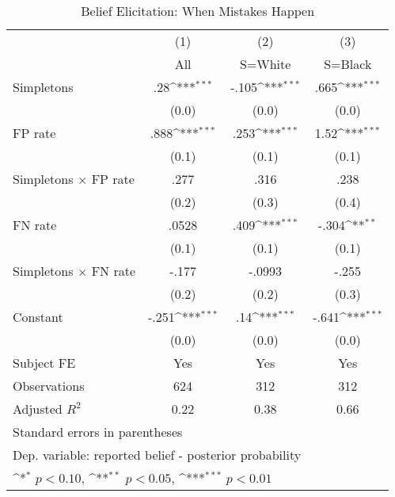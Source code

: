 \begin{table}[htbp]\centering
\def\sym#1{\ifmmode^{#1}\else\(^{#1}\)\fi}
\caption{Belief Elicitation: When Mistakes Happen}
\begin{tabular}{l*{3}{c}}
\hline\hline
                &\multicolumn{1}{c}{(1)}&\multicolumn{1}{c}{(2)}&\multicolumn{1}{c}{(3)}\\
                &\multicolumn{1}{c}{All}&\multicolumn{1}{c}{S=White}&\multicolumn{1}{c}{S=Black}\\
\hline
Simpletons      &      .28\sym{***}&    -.105\sym{***}&     .665\sym{***}\\
                &    (0.0)         &    (0.0)         &    (0.0)         \\
FP rate         &     .888\sym{***}&     .253\sym{***}&     1.52\sym{***}\\
                &    (0.1)         &    (0.1)         &    (0.1)         \\
Simpletons $\times$ FP rate&     .277         &     .316         &     .238         \\
                &    (0.2)         &    (0.3)         &    (0.4)         \\
FN rate         &    .0528         &     .409\sym{***}&    -.304\sym{**} \\
                &    (0.1)         &    (0.1)         &    (0.1)         \\
Simpletons $\times$ FN rate&    -.177         &   -.0993         &    -.255         \\
                &    (0.2)         &    (0.2)         &    (0.3)         \\
Constant        &    -.251\sym{***}&      .14\sym{***}&    -.641\sym{***}\\
                &    (0.0)         &    (0.0)         &    (0.0)         \\
Subject FE      &      Yes         &      Yes         &      Yes         \\
\hline
Observations    &      624         &      312         &      312         \\
Adjusted \(R^{2}\)&     0.22         &     0.38         &     0.66         \\
\hline\hline
\multicolumn{4}{l}{\footnotesize Standard errors in parentheses}\\
\multicolumn{4}{l}{\footnotesize Dep. variable: reported belief - posterior probability}\\
\multicolumn{4}{l}{\footnotesize \sym{*} \(p<0.10\), \sym{**} \(p<0.05\), \sym{***} \(p<0.01\)}\\
\end{tabular}
\end{table}
